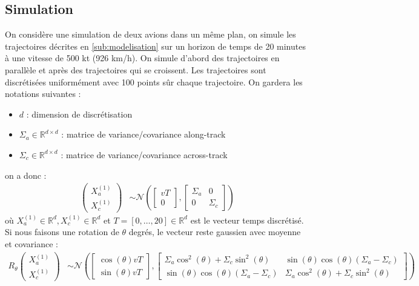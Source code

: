 \documentclass[a4paper, 12pt,twoside]{article}
\numberwithin{equation}{subsection}
\begin{document}
	
	\subsection{Simulation} %
	\label{sub:simulation}
	
	On considère une simulation de deux avions dans un même plan, on simule les trajectoires décrites en \ref{sub:modelisation} sur un horizon de temps de 20 minutes à une vitesse de 500 kt (926 km/h). On simule d'abord des trajectoires en parallèle et après des trajectoires qui se croissent. Les trajectoires sont discrétisées uniformément avec 100 points sûr chaque trajectoire. On gardera les notations suivantes : 
	\begin{itemize}
		\item $d$ : dimension de discrétisation
		\item $\Sigma_a \in \mathbb{R}^{d \times d}$ : matrice de variance/covariance along-track
		\item $\Sigma_c \in \mathbb{R}^{d \times d}$ : matrice de variance/covariance across-track 
	\end{itemize}
	on a donc :
	\begin{align}
		\left( \begin{array}{c}
			X^{(1)}_a \\
			X^{(1)}_c
		\end{array} \right) &\sim \mathcal{N} \left( \left[\begin{array}{c}
			vT \\ 0
		\end{array} \right] ,\left[ \begin{array}{cc}
			\Sigma_a & 0 \\
			0 & \Sigma_c
		\end{array} \right] \right)
	\end{align}
	où $X^{(1)}_a\in \mathbb{R}^d, X^{(1)}_c \in \mathbb{R}^d$ et $T=[0,\ldots,20]\in \mathbb{R}^d$ est le vecteur temps discrétisé. Si nous faisons une rotation de $\theta$ degrés, le vecteur reste gaussien avec moyenne et covariance : 
	\begin{align}
		R_{\theta} \left( \begin{array}{c}
			X^{(1)}_a \\
			X^{(1)}_c
		\end{array} \right) &\sim \mathcal{N} \left( \left[\begin{array}{c}
			\cos(\theta)vT \\ \sin(\theta)vT
		\end{array} \right] ,\left[ 
		\begin{array}{cc}
			\Sigma_a \cos^2(\theta) + \Sigma_c \sin^2(\theta)  & \sin(\theta)\cos(\theta)(\Sigma_a-\Sigma_c) \\
			\sin(\theta)\cos(\theta)(\Sigma_a-\Sigma_c) & \Sigma_a \cos^2(\theta) + \Sigma_c \sin^2(\theta)
		\end{array} 
		\right] \right)
	\end{align}
\end{document}
